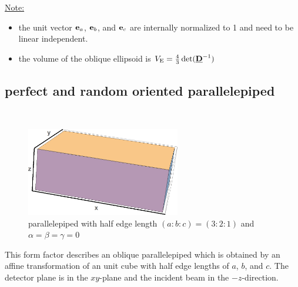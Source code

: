\noindent\underline{Note:}
\begin{itemize}
\item the unit vector $\B{e}_a$, $\B{e}_b$, and $\B{e}_c$ are internally normalized to 1 and need to be linear independent.
\item the volume of the oblique ellipsoid is $V_\mathrm{E}=\frac43\det(\M{D}^{-1})$
\end{itemize}

\subsection{perfect and random oriented parallelepiped} ~\\

\begin{figure}[htb]
\begin{center}
\includegraphics[width=0.6\textwidth]{../images/form_factor/supershapes/parallel_epiped321.png}
\end{center}
\caption{parallelepiped with half edge length $(a:b:c)=(3:2:1)$ and $\alpha=\beta=\gamma=0$}
\label{fig:opo_cube}
\end{figure}

This form factor describes an oblique parallelepiped which is obtained by an affine transformation of an unit cube with half edge lengths of $a$, $b$, and $c$. The detector plane is in the $xy$-plane and the incident beam in the $-z$-direction.



